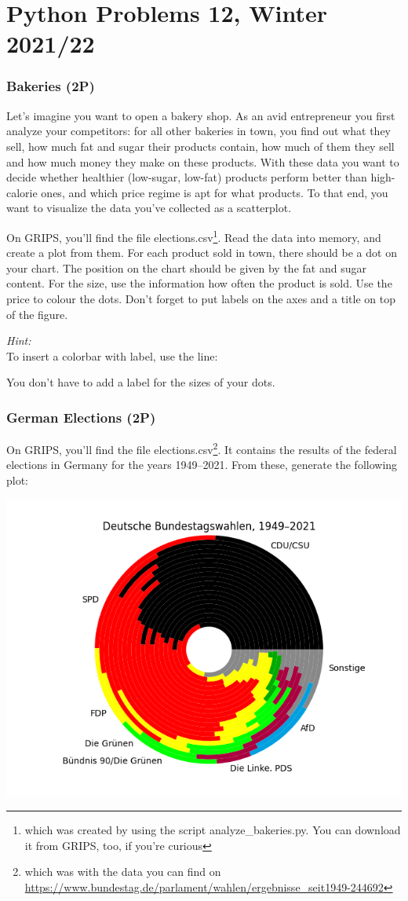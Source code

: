 \documentclass[
	english,
	fontsize=10pt,
	parskip=half,
	titlepage=true,
	DIV=12
]{scrartcl}
\begin{document}
\part*{Python Problems 12, Winter 2021/22}
\section{Bakeries (2\;P)}
Let's imagine you want to open a bakery shop. As an avid entrepreneur you first analyze your competitors: for all other bakeries in town, you find out what they sell, how much fat and sugar their products contain, how much of them they sell and how much money they make on these products. With these data you want to decide whether healthier (low-sugar, low-fat) products perform better than high-calorie ones, and which price regime is apt for what products. To that end, you want to visualize the data you've collected as a scatterplot.

On GRIPS, you'll find the file elections.csv\footnote{which was created by using the script analyze\_bakeries.py. You can download it from GRIPS, too, if you're curious}. Read the data into memory, and create a plot from them. For each product sold in town, there should be a dot on your chart. The position on the chart should be given by the fat and sugar content. For the size, use the information how often the product is sold. Use the price to colour the dots. Don't forget to put labels on the axes and a title on top of the figure.

\emph{Hint:}\\
To insert a colorbar with label, use the line:

You don't have to add a label for the sizes of your dots.


\section{German Elections (2\;P)}
On GRIPS, you'll find the file elections.csv\footnote{which was with the data you can find on \url{https://www.bundestag.de/parlament/wahlen/ergebnisse_seit1949-244692}}. It contains the results of the federal elections in Germany for the years 1949--2021. From these, generate the following plot:

\begin{center}
	\includegraphics[width=.7\linewidth]{./elections}
\end{center}
\end{document}
